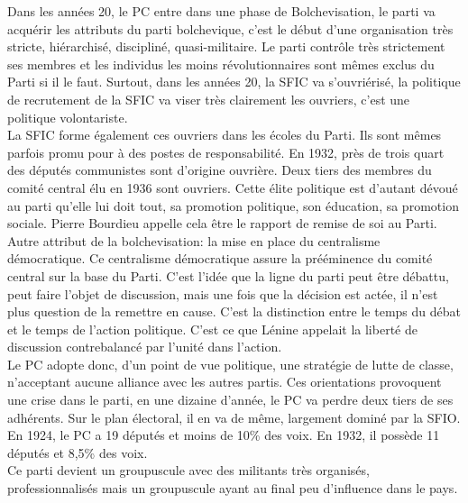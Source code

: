 \documentclass[10pt, a4paper, openany]{book}
\begin{document}
Dans les années 20, le PC entre dans une phase de Bolchevisation, le parti va acquérir les attributs du parti bolchevique, c'est le début d'une organisation très stricte, hiérarchisé, discipliné, quasi-militaire. Le parti contrôle très strictement ses membres et les individus les moins révolutionnaires sont mêmes exclus du Parti si il le faut. Surtout, dans les années 20, la SFIC va s'ouvriérisé, la politique de recrutement de la SFIC va viser très clairement les ouvriers, c'est une politique volontariste. \\
La SFIC forme également ces ouvriers dans les écoles du Parti. Ils sont mêmes parfois promu pour à des postes de responsabilité. En 1932, près de trois quart des députés communistes sont d'origine ouvrière. Deux tiers des membres du comité central élu en 1936 sont ouvriers. Cette élite politique est d'autant dévoué au parti qu'elle lui doit tout, sa promotion politique, son éducation, sa promotion sociale. Pierre Bourdieu appelle cela être le rapport de remise de soi au Parti. \\
Autre attribut de la bolchevisation: la mise en place du centralisme démocratique. Ce centralisme démocratique assure la prééminence du comité central sur la base du Parti. C'est l'idée que la ligne du parti peut être débattu, peut faire l'objet de discussion, mais une fois que la décision est actée, il n'est plus question de la remettre en cause. C'est la distinction entre le temps du débat et le temps de l'action politique. C'est ce que Lénine appelait la liberté de discussion contrebalancé par l'unité dans l'action. \\
Le PC adopte donc, d'un point de vue politique, une stratégie de lutte de classe, n'acceptant aucune alliance avec les autres partis. Ces orientations provoquent une crise dans le parti, en une dizaine d'année, le PC va perdre deux tiers de ses adhérents. Sur le plan électoral, il en va de même, largement dominé par la SFIO. En 1924, le PC a 19 députés et moins de 10\% des voix. En 1932, il possède 11 députés et 8,5\% des voix. \\
Ce parti devient un groupuscule avec des militants très organisés, professionnalisés mais un groupuscule ayant au final peu d'influence dans le pays.
\end{document}
